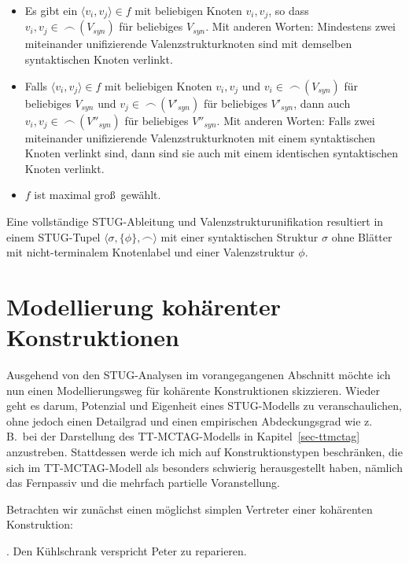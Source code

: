 \begin{itemize}
  \item Es gibt ein $\langle v_i,v_j \rangle \in f$ mit beliebigen Knoten $v_i,v_j$, so dass $v_i,v_j \in \; \frown\,(V_{syn})$ für beliebiges $V_{syn}$. Mit anderen Worten: Mindestens zwei miteinander unifizierende Valenzstrukturknoten sind mit demselben syntaktischen Knoten verlinkt.
  \item Falls $\langle v_i,v_j \rangle \in f$ mit beliebigen Knoten $v_i,v_j$ und $v_i \in \; \frown\,(V_{syn})$ für beliebiges $V_{syn}$ und $v_j \in \; \frown\,(V'_{syn})$ für beliebiges $V'_{syn}$, dann auch $v_i,v_j \in \; \frown\,(V''_{syn})$ für beliebiges $V''_{syn}$. Mit anderen Worten: Falls zwei miteinander unifizierende Valenzstrukturknoten mit einem syntaktischen Knoten verlinkt sind, dann sind sie auch mit einem identischen syntaktischen Knoten verlinkt.
  \item $f$ ist maximal gro\ss\ gewählt.
\end{itemize}

Eine vollständige STUG-Ableitung und Valenzstrukturunifikation resultiert in einem STUG-Tupel $\langle \sigma, \{\phi\}, \frown \rangle$ mit einer syntaktischen Struktur $\sigma$ ohne Blätter mit nicht-termina\-lem Knotenlabel und einer Valenzstruktur $\phi$.


\section{Modellierung kohärenter Konstruktionen} \label{sec-stug-kohaerenz}

Ausgehend von den STUG-Analysen im vorangegangenen Abschnitt möchte ich nun einen Modellierungsweg für kohärente Konstruktionen skizzieren. Wieder geht es darum, Potenzial und Eigenheit eines STUG-Modells zu veranschaulichen, ohne jedoch einen Detailgrad und einen empirischen Abdeckungsgrad wie z.\,B.\ bei der Darstellung des TT-MCTAG-Modells in Kapitel~\ref{sec-ttmctag} anzustreben. Stattdessen werde ich mich auf Konstruktionstypen beschränken, die sich im TT-MCTAG-Modell als besonders schwierig herausgestellt haben, nämlich das Fernpassiv und die mehrfach partielle Voranstellung.

Betrachten wir zunächst einen möglichst simplen Vertreter einer kohärenten Konstruktion: 

\ex. \label{ex-stug-5} Den Kühlschrank verspricht Peter zu reparieren.

